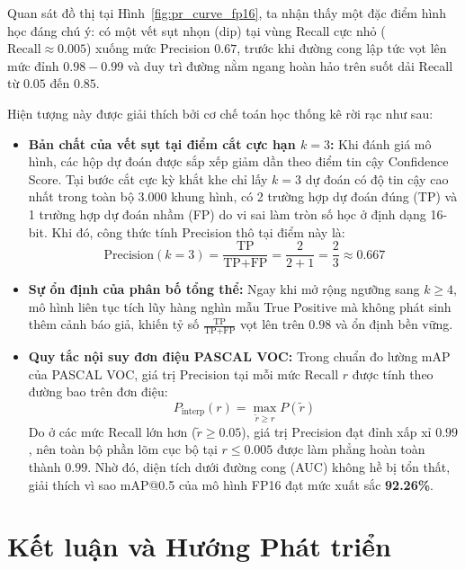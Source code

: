 \documentclass[11pt,a4paper]{article}
\begin{document}
Quan sát đồ thị tại Hình~\ref{fig:pr_curve_fp16}, ta nhận thấy một đặc điểm hình học đáng chú ý: có một vết sụt nhọn (dip) tại vùng Recall cực nhỏ ($\text{Recall} \approx 0.005$) xuống mức Precision $0.67$, trước khi đường cong lập tức vọt lên mức đỉnh $0.98 - 0.99$ và duy trì đường nằm ngang hoàn hảo trên suốt dải Recall từ $0.05$ đến $0.85$.

Hiện tượng này được giải thích bởi cơ chế toán học thống kê rời rạc như sau:
\begin{itemize}
    \item \textbf{Bản chất của vết sụt tại điểm cắt cực hạn $k=3$:} Khi đánh giá mô hình, các hộp dự đoán được sắp xếp giảm dần theo điểm tin cậy Confidence Score. Tại bước cắt cực kỳ khắt khe chỉ lấy $k=3$ dự đoán có độ tin cậy cao nhất trong toàn bộ 3.000 khung hình, có 2 trường hợp dự đoán đúng (TP) và 1 trường hợp dự đoán nhầm (FP) do vi sai làm tròn số học ở định dạng 16-bit. Khi đó, công thức tính Precision thô tại điểm này là:
    \begin{equation}
    \text{Precision}(k=3) = \frac{\text{TP}}{\text{TP} + \text{FP}} = \frac{2}{2 + 1} = \frac{2}{3} \approx 0.667
    \end{equation}
    \item \textbf{Sự ổn định của phân bố tổng thể:} Ngay khi mở rộng ngưỡng sang $k \ge 4$, mô hình liên tục tích lũy hàng nghìn mẫu True Positive mà không phát sinh thêm cảnh báo giả, khiến tỷ số $\frac{\text{TP}}{\text{TP} + \text{FP}}$ vọt lên trên $0.98$ và ổn định bền vững.
    \item \textbf{Quy tắc nội suy đơn điệu PASCAL VOC:} Trong chuẩn đo lường mAP của PASCAL VOC, giá trị Precision tại mỗi mức Recall $r$ được tính theo đường bao trên đơn điệu:
    \begin{equation}
    P_{\text{interp}}(r) = \max_{\tilde{r} \ge r} P(\tilde{r})
    \end{equation}
    Do ở các mức Recall lớn hơn ($\tilde{r} \ge 0.05$), giá trị Precision đạt đỉnh xấp xỉ $0.99$, nên toàn bộ phần lõm cục bộ tại $r \le 0.005$ được làm phẳng hoàn toàn thành $0.99$. Nhờ đó, diện tích dưới đường cong (AUC) không hề bị tổn thất, giải thích vì sao mAP@0.5 của mô hình FP16 đạt mức xuất sắc \textbf{92.26\%}.
\end{itemize}

\section{Kết luận và Hướng Phát triển}
\end{document}
